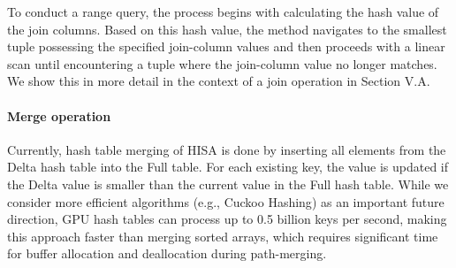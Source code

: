 \documentclass[nonacm,sigplan]{acmart}
\newcommand{\revised}[1]{{#1}}
\begin{document}
To conduct a range query, the process begins with calculating the hash value of the join columns. Based on this hash value, the method navigates to the smallest tuple possessing the specified join-column values and then proceeds with a linear scan until encountering a tuple where the join-column value no longer matches. We show this in more detail in the context of a join operation in Section V.A.

\paragraph*{Merge operation}
\revised{Currently, hash table merging of HISA is done by inserting all elements from the Delta hash table into the Full table. For each existing key, the value is updated if the Delta value is smaller than the current value in the Full hash table. While we consider  more efficient algorithms (e.g., Cuckoo Hashing\cite{li2021dycuckoo}) as an important future direction, GPU hash tables can process up to 0.5 billion keys per second, making this approach faster than merging sorted arrays, which requires significant time for buffer allocation and deallocation during path-merging. }


\end{document}
